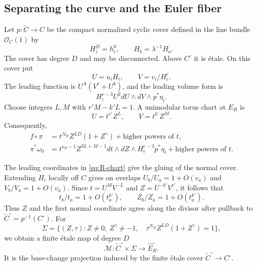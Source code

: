 \documentclass[11pt]{article}
\numberwithin{equation}{section}
\theoremstyle{definition}
\theoremstyle{remark}
\newcommand{\OO}{\mathcal O}
\newcommand{\omegao}{\omega_0}
\begin{document}
\subsection{Separating the curve and the Euler fiber}

Let $p:\widetilde C\to C$ be the compact normalized cyclic
cover defined in the line bundle $\OO_C(1)$ by
\begin{equation}\label{eq:root-curve}
 H_i^D=h_i^0,\qquad H_b=\lambda^{-1}H_a.
\end{equation}
The cover has degree $D$ and may be disconnected. Above
$C^\circ$ it is \'etale. On this cover put
\[
 U=u_iH_i,\qquad V=v_i/H_i^e.
\]
The leading function is $U^A(V^r+U^k)$, and the leading
volume form is
\begin{equation}\label{eq:trivialized-volume}
 H_i^{e-3}U^2dU\wedge dV\wedge p^*\eta_i.
\end{equation}
Choose integers $L,M$ with $r'M-k'L=1$. A unimodular
torus chart at $E_R$ is
\begin{equation}\label{eq:R-chart}
 U=t^{r'}Z^L,\qquad V=t^{k'}Z^M.
\end{equation}
Consequently,
\begin{equation}\label{eq:R-leading}
 \begin{split}
 f\circ\pi&=t^{N_R}Z^{LD}(1+Z^\gamma)
                   +\text{higher powers of }t,\\
 \pi^*\omegao&=t^{\nu_R-1}Z^{3L+M-1}dt\wedge dZ
                   \wedge H_i^{e-3}p^*\eta_i
                   +\text{higher powers of }t.
 \end{split}
\end{equation}

The leading coordinates in \eqref{eq:R-chart} give
the gluing of the normal cover. Extending
$H_i$ locally off $C$ gives on overlaps
$U_b/U_a=1+O(v_a)$ and $V_b/V_a=1+O(v_a)$. Since
$t=U^MV^{-L}$ and $Z=U^{-k'}V^{r'}$, it follows that
\begin{equation}\label{eq:normal-gluing}
 t_b/t_a=1+O(t_a^{k'}),\qquad Z_b/Z_a=1+O(t_a^{k'}).
\end{equation}
Thus $Z$ and the first normal coordinate agree along the
divisor after pullback to $\widetilde C^\circ=p^{-1}(C^\circ)$.
For
\begin{equation}\label{eq:Sigma}
 \Sigma=\{(Z,\tau):Z\ne0,\ Z^\gamma\ne-1,\quad
         \tau^{N_R}Z^{LD}(1+Z^\gamma)=1\},
\end{equation}
we obtain a finite \'etale map of degree $D$
\begin{equation}\label{eq:product-map}
 \mathcal M:\widetilde C^\circ\times\Sigma
                   \longrightarrow\widehat E_R^\circ.
\end{equation}
It is the base-change projection induced by the finite \'etale
cover $\widetilde C^\circ\to C^\circ$.
\end{document}
